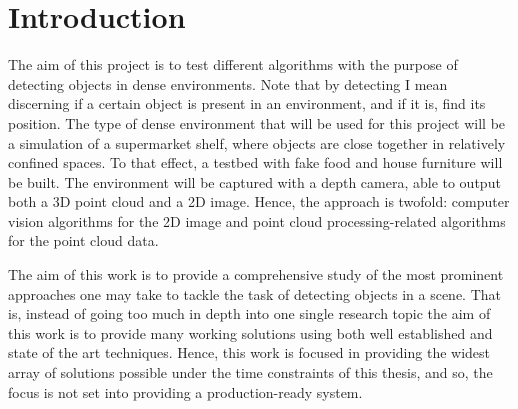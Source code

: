 \documentclass[../main.tex]{subfiles}
\begin{document}
\section{Introduction}
The aim of this project is to test different algorithms with the purpose of detecting objects in dense environments. Note that by detecting I mean discerning if a certain object is present in an environment, and if it is, find its position. The type of dense environment that will be used for this project will be a simulation of a supermarket shelf, where objects are close together in relatively confined spaces. To that effect, a testbed with fake food and house furniture will be built. The environment will be captured with a depth camera, able to output both a 3D point cloud and a 2D image. Hence, the approach is twofold: computer vision algorithms for the 2D image and point cloud processing-related algorithms for the point cloud data.

The aim of this work is to provide a comprehensive study of the most prominent approaches one may take to tackle the task of detecting objects in a scene. That is, instead of going too much in depth into one single research topic the aim of this work is to provide many working solutions using both well established and state of the art techniques. Hence, this work is focused in providing the widest array of solutions possible under the time constraints of this thesis, and so, the focus is not set into providing a production-ready system.


 
\end{document}
